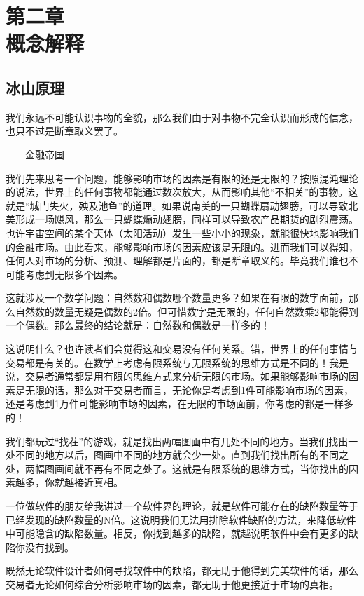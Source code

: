 \section[第二章\q 概念解释]{第二章\\ 概念解释}

\subsection{冰山原理}

{\kaishu
我们永远不可能认识事物的全貌，那么我们由于对事物不完全认识而形成的信念，也只不过是断章取义罢了。

\hfill ——金融帝国
}

我们先来思考一个问题，能够影响市场的因素是有限的还是无限的？按照混沌理论的说法，世界上的任何事物都能通过数次放大，从而影响其他“不相关”的事物。这就是“城门失火，殃及池鱼”的道理。如果说南美的一只蝴蝶扇动翅膀，可以导致北美形成一场飓风，那么一只蝴蝶煽动翅膀，同样可以导致农产品期货的剧烈震荡。也许宇宙空间的某个天体（太阳活动）发生一些小小的现象，就能很快地影响我们的金融市场。由此看来，能够影响市场的因素应该是无限的。进而我们可以得知，任何人对市场的分析、预测、理解都是片面的，都是断章取义的。毕竟我们谁也不可能考虑到无限多个因素。

这就涉及一个数学问题：自然数和偶数哪个数量更多？如果在有限的数字面前，那么自然数的数量无疑是偶数的2倍。但可惜数字是无限的，任何自然数乘2都能得到一个偶数。那么最终的结论就是：自然数和偶数是一样多的！

这说明什么？也许读者们会觉得这和交易没有任何关系。错，世界上的任何事情与交易都是有关的。在数学上考虑有限系统与无限系统的思维方式是不同的！我是说，交易者通常都是用有限的思维方式来分析无限的市场。如果能够影响市场的因素是无限的话，那么对于交易者而言，无论你是考虑到1件可能影响市场的因素，还是考虑到1万件可能影响市场的因素，在无限的市场面前，你考虑的都是一样多的！

我们都玩过“找茬”的游戏，就是找出两幅图画中有几处不同的地方。当我们找出一处不同的地方以后，图画中不同的地方就会少一处。直到我们找出所有的不同之处，两幅图画间就不再有不同之处了。这就是有限系统的思维方式，当你找出的因素越多，你就越接近真相。

一位做软件的朋友给我讲过一个软件界的理论，就是软件可能存在的缺陷数量等于已经发现的缺陷数量的N倍。这说明我们无法用排除软件缺陷的方法，来降低软件中可能隐含的缺陷数量。相反，你找到越多的缺陷，就越说明软件中会有更多的缺陷你没有找到。

既然无论软件设计者如何寻找软件中的缺陷，都无助于他得到完美软件的话，那么交易者无论如何综合分析影响市场的因素，都无助于他更接近于市场的真相。

